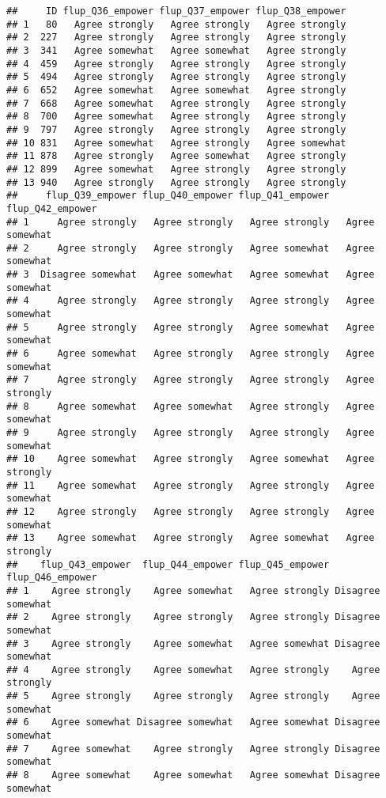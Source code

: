 \documentclass[]{article}
\begin{document}
\begin{verbatim}
##     ID flup_Q36_empower flup_Q37_empower flup_Q38_empower
## 1   80   Agree strongly   Agree strongly   Agree strongly
## 2  227   Agree strongly   Agree strongly   Agree strongly
## 3  341   Agree somewhat   Agree somewhat   Agree strongly
## 4  459   Agree strongly   Agree strongly   Agree strongly
## 5  494   Agree strongly   Agree strongly   Agree strongly
## 6  652   Agree somewhat   Agree somewhat   Agree strongly
## 7  668   Agree somewhat   Agree strongly   Agree strongly
## 8  700   Agree somewhat   Agree strongly   Agree strongly
## 9  797   Agree strongly   Agree strongly   Agree strongly
## 10 831   Agree somewhat   Agree strongly   Agree somewhat
## 11 878   Agree strongly   Agree somewhat   Agree strongly
## 12 899   Agree somewhat   Agree strongly   Agree strongly
## 13 940   Agree strongly   Agree strongly   Agree strongly
##     flup_Q39_empower flup_Q40_empower flup_Q41_empower flup_Q42_empower
## 1     Agree strongly   Agree strongly   Agree strongly   Agree somewhat
## 2     Agree strongly   Agree strongly   Agree somewhat   Agree somewhat
## 3  Disagree somewhat   Agree somewhat   Agree somewhat   Agree somewhat
## 4     Agree strongly   Agree strongly   Agree strongly   Agree somewhat
## 5     Agree strongly   Agree strongly   Agree somewhat   Agree somewhat
## 6     Agree somewhat   Agree strongly   Agree strongly   Agree somewhat
## 7     Agree strongly   Agree strongly   Agree strongly   Agree strongly
## 8     Agree somewhat   Agree somewhat   Agree strongly   Agree somewhat
## 9     Agree strongly   Agree strongly   Agree strongly   Agree somewhat
## 10    Agree somewhat   Agree strongly   Agree somewhat   Agree strongly
## 11    Agree somewhat   Agree strongly   Agree strongly   Agree somewhat
## 12    Agree strongly   Agree strongly   Agree strongly   Agree somewhat
## 13    Agree somewhat   Agree strongly   Agree somewhat   Agree strongly
##    flup_Q43_empower  flup_Q44_empower flup_Q45_empower  flup_Q46_empower
## 1    Agree strongly    Agree somewhat   Agree strongly Disagree somewhat
## 2    Agree strongly    Agree strongly   Agree strongly Disagree somewhat
## 3    Agree strongly    Agree somewhat   Agree somewhat Disagree somewhat
## 4    Agree strongly    Agree somewhat   Agree strongly    Agree strongly
## 5    Agree strongly    Agree strongly   Agree strongly    Agree somewhat
## 6    Agree somewhat Disagree somewhat   Agree somewhat Disagree somewhat
## 7    Agree somewhat    Agree strongly   Agree strongly Disagree somewhat
## 8    Agree somewhat    Agree somewhat   Agree somewhat Disagree somewhat

\end{verbatim}
\end{document}
